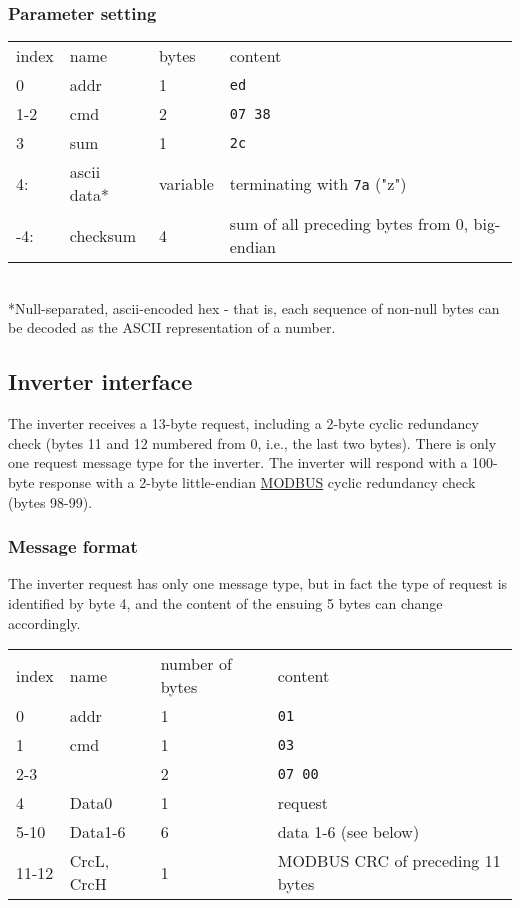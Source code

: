 \documentclass[pdftex,oneside,12pt,a4paper]{book}
\begin{document}
\subsubsection{Parameter setting}
\noindent
\begin{tabular}{llll}
index & name & bytes & content\\
0 & addr & 1 & \verb|ed|\\
1-2 & cmd & 2 & \verb|07 38|\\
3 & sum & 1 & \verb|2c|\\
4: & ascii data* & variable & terminating with \verb|7a| ("z")\\
-4: & checksum & 4 & sum of all preceding bytes from 0, big-endian
\end{tabular}\\
{*}Null-separated, ascii-encoded hex - that is, each sequence of non-null bytes can be decoded as the ASCII representation of a number.

\subsection{Inverter interface}
The inverter receives a 13-byte request, including a 2-byte cyclic
redundancy check (bytes 11 and 12 numbered from 0, i.e., the last two
bytes). There is only one request message type for the inverter. The inverter
will respond with a 100-byte response with a 2-byte little-endian
\href{http://regregex.bbcmicro.net/crc-catalogue.htm#crc.cat.modbus}{MODBUS} cyclic redundancy check (bytes 98-99).

\subsubsection{Message format}
The inverter request has only one message type, but in fact the type of
request is identified by byte 4, and the content of the ensuing 5 bytes
can change accordingly.\\
\begin{tabular}{llll}
index & name & number of bytes & content\\
0 & addr & 1 & \verb|01| \\
1 & cmd & 1 & \verb|03| \\
2-3 & & 2 & \verb|07 00| \\
4 & Data0 & 1 & request \\
5-10 & Data1-6 & 6 & data 1-6 (see below) \\
11-12 & CrcL, CrcH & 1 & MODBUS CRC of preceding 11 bytes 
\end{tabular}
\end{document}
